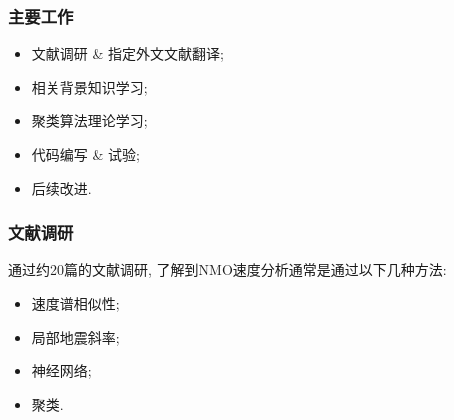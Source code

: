 \documentclass[11pt, professionalfonts]{beamer}
\begin{document}
{
\songti
\maketitle

\begin{frame}
    \frametitle{主要工作}
    \begin{itemize}
        \item 文献调研 \& 指定外文文献翻译; 
        \vspace{10pt}\item 相关背景知识学习; 
        \vspace{10pt}\item 聚类算法理论学习; 
        \vspace{10pt}\item 代码编写 \& 试验; 
        \vspace{10pt}\item 后续改进. 
    \end{itemize}
\end{frame}

\begin{frame}[shrink]
    \frametitle{文献调研}
    \vspace{10pt}
    通过约20篇的文献调研, 了解到NMO速度分析通常是通过以下几种方法: 
    
    \vspace{20pt}
    \begin{center}
        \begin{minipage}{.35\textwidth}
            \begin{itemize}
                \item 速度谱相似性; 

                \vspace{10pt}\item 局部地震斜率; 
                
                \vspace{10pt}\item 神经网络; 
                
                \vspace{10pt}\item 聚类. 
            \end{itemize}
        \end{minipage}
    \end{center}
\end{frame}

}
\end{document}
